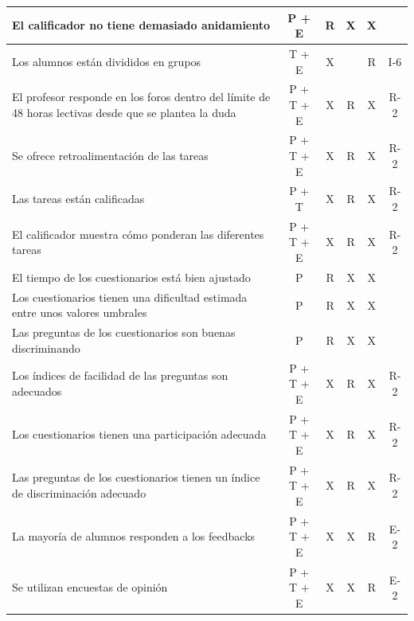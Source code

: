 \begin{center}
\begin{longtable}{p{3cm} c c c c c}
        \hline
        El calificador no tiene demasiado anidamiento & P + E & R & X & X & \\
        \hline
        Los alumnos están divididos en grupos & T + E & X & & R & I-6 \\
        \hline
        El profesor responde en los foros dentro del límite de 48 horas lectivas desde que se plantea la duda & P + T + E & X & R & X & R-2 \\
        \hline
        Se ofrece retroalimentación de las tareas & P + T + E & X & R & X & R-2 \\
        \hline
        Las tareas están calificadas & P + T & X & R & X & R-2 \\
        \hline
        El calificador muestra cómo ponderan las diferentes tareas & P + T + E & X & R & X & R-2 \\
        \hline
        El tiempo de los cuestionarios está bien ajustado & P & R & X & X & \\
        \hline
        Los cuestionarios tienen una dificultad estimada entre unos valores umbrales & P & R & X & X & \\
        \hline
        Las preguntas de los cuestionarios son buenas discriminando & P & R & X & X & \\
        \hline
        Los índices de facilidad de las preguntas son adecuados & P + T + E & X & R & X & R-2 \\
        \hline
        Los cuestionarios tienen una participación adecuada & P + T + E & X & R & X & R-2 \\
        \hline     
        Las preguntas de los cuestionarios tienen un índice de discriminación adecuado & P + T + E & X & R & X & R-2\\
        \hline             
        La mayoría de alumnos responden a los feedbacks & P + T + E & X & X & R & E-2 \\
        \hline
        Se utilizan encuestas de opinión & P + T + E & X & X & R & E-2 \\
        \hline
    \end{longtable}
\end{center}
